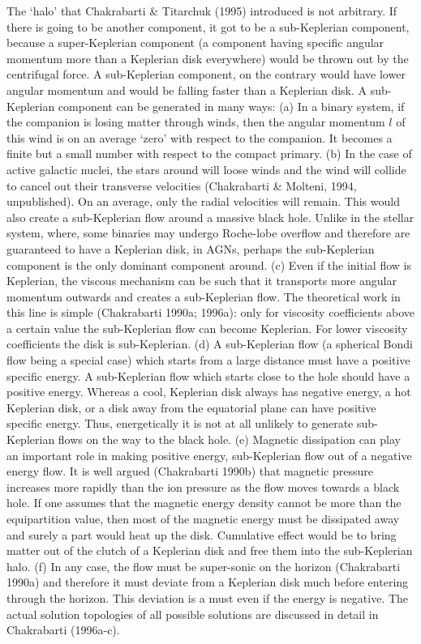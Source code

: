 \documentclass{ws-procs975x65}
\begin{document}
The `halo' that Chakrabarti \& Titarchuk (1995) introduced is not arbitrary. If there is going to be another
component, it got to be a sub-Keplerian component, because a super-Keplerian component (a component having
specific angular momentum more than a Keplerian disk everywhere) would be thrown out by the 
centrifugal  force.
A sub-Keplerian component, on the contrary would have lower angular momentum and would be falling
faster than a Keplerian disk. A sub-Keplerian component can be generated in many ways: (a) In a binary system, 
if the companion is losing matter through winds, then the angular momentum  $l$ 
of this wind is on an average `zero' with respect to the companion. 
It becomes a finite but a small number with respect to the compact primary. (b) In the case of active 
galactic nuclei, the stars around will loose winds and the wind will collide to cancel out their 
transverse velocities (Chakrabarti \& Molteni, 1994, unpublished). On an average, only the radial
velocities will remain.  This would also create a sub-Keplerian flow around a massive black hole. 
Unlike in the stellar system, where, some binaries may undergo Roche-lobe overflow and therefore
are guaranteed to have a Keplerian disk, in AGNs, perhaps the sub-Keplerian component is the only 
dominant component around. (c) Even if the initial flow is Keplerian, the viscous mechanism can be
such that it transports more angular momentum outwards and creates a sub-Keplerian flow. The theoretical 
work in this line is simple (Chakrabarti 1990a; 1996a): only for viscosity coefficients above a certain value 
the sub-Keplerian flow can become Keplerian. For lower viscosity coefficients the disk is sub-Keplerian. (d) A sub-Keplerian 
flow (a spherical Bondi flow being a special case) which starts from a large distance
must have a positive specific energy. A sub-Keplerian flow which starts 
close to the hole should have a positive energy. Whereas a cool, Keplerian disk always has negative energy,
a hot Keplerian disk, or a disk away from the equatorial plane can have positive specific energy. Thus,
energetically it is not at all unlikely to generate sub-Keplerian flows on the way to the black hole.
(e) Magnetic dissipation can play an important role in making positive energy, sub-Keplerian 
flow out of a negative energy flow. It is well argued (Chakrabarti 1990b)
that magnetic pressure increases more rapidly than the ion pressure as the flow moves 
towards a black hole. If one assumes that the magnetic energy density cannot be 
more than the equipartition value, then most of the magnetic energy must be dissipated away
and surely a part would heat up the disk. Cumulative effect would be to bring matter 
out of the clutch of a Keplerian disk and free them into the sub-Keplerian halo.
(f) In any case, the flow must be super-sonic on the horizon (Chakrabarti 1990a) and
therefore it must deviate from a Keplerian disk much before entering through the horizon.
This deviation is a must even if the energy is negative.  The actual solution topologies of
all possible solutions are discussed in detail in Chakrabarti (1996a-c).
\end{document}

